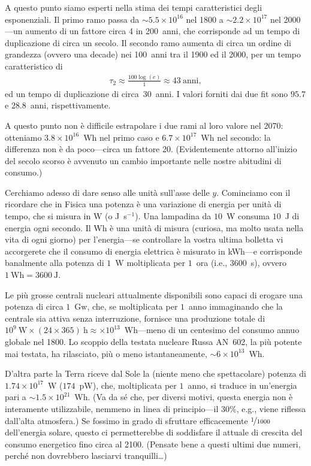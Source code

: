 \begin{solution}

A questo punto siamo esperti nella stima dei tempi caratteristici degli esponenziali.
Il primo ramo passa da $\sim 5.5 \times 10^{16}$ nel 1800 a $\sim 2.2 \times 10^{17}$
nel 2000---un aumento di un fattore circa 4 in 200~anni, che corrisponde ad un tempo
di duplicazione di circa un secolo. Il secondo ramo aumenta di circa un ordine di
grandezza (ovvero una decade) nei 100~anni tra il 1900 ed il 2000, per un tempo
caratteristico di
\begin{align*}
  \tau_2 \approx \frac{100 \log(e)}{1} \approx 43~\text{anni},
\end{align*}
ed un tempo di duplicazione di circa~$30$~anni. I valori forniti dai due fit sono
$95.7$ e $28.8$~anni, rispettivamente.

A questo punto non è difficile estrapolare i due rami al loro valore nel
2070: otteniamo $3.8 \times 10^{16}$~Wh nel primo caso e $6.7 \times 10^{17}$~Wh nel
secondo: la differenza non è da poco---circa un fattore 20. (Evidentemente attorno
all'inizio del secolo scorso è avvenuto un cambio importante nelle nostre abitudini
di consumo.)

Cerchiamo adesso di dare senso alle unità sull'asse delle $y$. Cominciamo con il
ricordare che in Fisica una potenza è una variazione di energia per unità di
tempo, che si misura in W (o J~s$^{-1}$). Una lampadina da $10$~W consuma $10$~J
di energia ogni secondo. Il Wh è una unità di misura (curiosa, ma molto usata
nella vita di ogni giorno) per l'energia---se controllare la vostra ultima bolletta
vi accorgerete che il consumo di energia elettrica è misurato in kWh---e corrisponde
banalmente alla potenza di $1$~W moltiplicata per $1$~ora (i.e., $3600$~s), ovvero
$1~\text{Wh} = 3600~\text{J}$.

Le più grosse centrali nucleari attualmente disponibili sono capaci di erogare
una potenza di circa $1$~Gw, che, se moltiplicata per $1$~anno immaginando che
la centrale sia attiva senza interruzione, fornisce una produzione totale di
$10^9~\text{W} \times (24 \times 365)~\text{h} \approx \times 10^{13}$~Wh---meno
di un centesimo del consumo annuo globale nel 1800. Lo scoppio della testata
nucleare Russa AN~602, la più potente mai testata, ha rilasciato, più o meno
istantaneamente, $\sim 6 \times 10^{13}$~Wh.

D'altra parte la Terra riceve dal Sole la (niente meno che spettacolare) potenza di
$1.74 \times 10^{17}$~W ($174$~pW), che, moltiplicata per $1$~anno, si traduce
in un'energia pari a $\sim 1.5 \times 10^{21}$~Wh. (Va da sé che, per diversi
motivi, questa energia non è interamente utilizzabile, nemmeno in linea di
principio---il 30\%, e.g., viene riflessa dall'alta atmosfera.) Se fossimo in grado
di sfruttare efficacemente $\nicefrac{1}{1000}$ dell'energia solare, questo ci
permetterebbe di soddisfare il  attuale di crescita del consumo
energetico fino circa al 2100. (Pensate bene a questi ultimi due numeri, perché
non dovrebbero lasciarvi tranquilli\ldots)

\end{solution}



